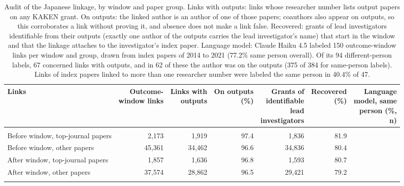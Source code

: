\begin{table}[H]
\centering\small
\caption{Audit of the Japanese linkage, by window and paper group. Links with outputs: links whose researcher number lists output papers on any KAKEN grant. On outputs: the linked author is an author of one of those papers; coauthors also appear on outputs, so this corroborates a link without proving it, and absence does not make a link false. Recovered: grants of lead investigators identifiable from their outputs (exactly one author of the outputs carries the lead investigator's name) that start in the window and that the linkage attaches to the investigator's index paper. Language model: Claude Haiku 4.5 labeled 150 outcome-window links per window and group, drawn from index papers of 2014 to 2021 (77.2\% same person overall). Of its 94 different-person labels, 67 concerned links with outputs, and in 62 of these the author was on the outputs (375 of 384 for same-person labels). Links of index papers linked to more than one researcher number were labeled the same person in 40.4\% of 47.}\label{tab:s_jp_audit}
\footnotesize
\begin{tabularx}{\linewidth}{>{\raggedright\arraybackslash}Xrrrrrr}
\toprule
Links & \makecell[rb]{Outcome-\\window links} & \makecell[rb]{Links with\\outputs} & \makecell[rb]{On outputs\\(\%)} & \makecell[rb]{Grants of\\identifiable\\lead\\investigators} & \makecell[rb]{Recovered\\(\%)} & \makecell[rb]{Language\\model, same\\person (\%,\\n)} \\
\midrule
\multicolumn{7}{>{\raggedright\arraybackslash}p{\dimexpr\textwidth-2\tabcolsep\relax}}{\textit{Index papers 2014--2018}} \\
Before window, top-journal papers & 2,173 & 1,919 & 97.4 & 1,836 & 81.9 &  \\
Before window, other papers & 45,361 & 34,462 & 96.6 & 34,836 & 80.4 &  \\
After window, top-journal papers & 1,857 & 1,636 & 96.8 & 1,593 & 80.7 &  \\
After window, other papers & 37,574 & 28,862 & 96.5 & 29,421 & 79.2 &  \\
\multicolumn{7}{>{\raggedright\arraybackslash}p{\dimexpr\textwidth-2\tabcolsep\relax}}{\textit{Index papers 2014--2021}} \\

\end{tabularx}
\end{table}
